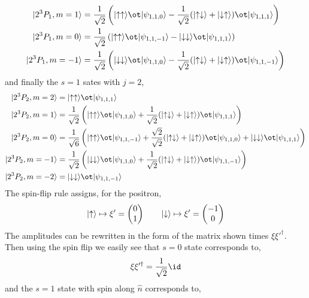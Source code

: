 \documentclass[12pt]{article}
\DeclarePairedDelimiter\ket{\lvert}{\rangle}
\begin{document}
\begin{align*}
\ket{2^{3} P_1, m = 1} &= \frac{1}{\sqrt{2}} \left( \ket{\uparrow \uparrow} \ot \ket{\psi_{1,1,0}} - \frac{1}{\sqrt{2}} (\ket{\uparrow \downarrow} + \ket{\downarrow \uparrow}) \ot \ket{\psi_{1,1,1}} \right) 
\\
\ket{2^{3} P_1, m = 0} &= \frac{1}{\sqrt{2}} \left( \ket{\uparrow \uparrow} \ot \ket{\psi_{1,1,-1}} - \ket{\downarrow \downarrow} \ot \ket{\psi_{1,1,1}} \right) 
\\
\ket{2^{3} P_1, m = -1} &= \frac{1}{\sqrt{2}} \left( \ket{\downarrow \downarrow} \ot \ket{\psi_{1,1,0}} - \frac{1}{\sqrt{2}} (\ket{\uparrow \downarrow} + \ket{\downarrow \uparrow}) \ot \ket{\psi_{1,1,-1}} \right) 
\end{align*}
and finally the $s = 1$ sates with $j = 2$,
\begin{align*}
\ket{2^3 P_2, m = 2} & = \ket{\uparrow \uparrow} \ot \ket{\psi_{1,1,1}}
\\
\ket{2^3 P_2, m = 1} & = \frac{1}{\sqrt{2}} \left( \ket{\uparrow \uparrow} \ot \ket{\psi_{1,1,0}} + \frac{1}{\sqrt{2}} (\ket{\uparrow \downarrow} + \ket{\downarrow \uparrow}) \ot \ket{\psi_{1,1,1}} \right)
\\
\ket{2^3 P_2, m = 0} & = \frac{1}{\sqrt{6}} \left( \ket{\uparrow \uparrow} \ot \ket{\psi_{1,1,-1}} + \frac{\sqrt{2}}{\sqrt{2}} (\ket{\uparrow \downarrow} + \ket{\downarrow \uparrow}) \ot \ket{\psi_{1,1,0}} + \ket{\downarrow \downarrow} \ot \ket{\psi_{1,1,1}} \right)
\\
\ket{2^3 P_2, m = -1} & = \frac{1}{\sqrt{2}} \left( \ket{\downarrow \downarrow} \ot \ket{\psi_{1,1,0}} + \frac{1}{\sqrt{2}} (\ket{\uparrow \downarrow} + \ket{\downarrow \uparrow}) \ot \ket{\psi_{1,1,-1}} \right)
\\
\ket{2^3 P_2, m = -2} & = \ket{\downarrow \downarrow} \ot \ket{\psi_{1,1,-1}}
\end{align*}
The spin-flip rule assigns, for the positron,
\[ \ket{\uparrow} \mapsto \xi' = \begin{pmatrix}
0 
\\
1
\end{pmatrix}
\quad \quad
\ket{\downarrow} \mapsto \xi' = \begin{pmatrix}
-1
\\
0
\end{pmatrix} \]
The amplitudes can be rewritten in the form of the matrix shown times $\xi \xi'^{\dagger}$. Then using the spin flip we easily see that $s = 0$ state corresponds to,
\[ \xi \xi'^\dagger = \frac{1}{\sqrt{2}} \id \]
and the $s = 1$ state with spin along $\hat{n}$ corresponds to,
\end{document}

